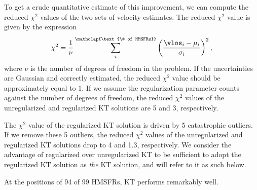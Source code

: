 To get a crude quantitative estimate of this improvement, we can compute the reduced $\chi^2$ values of the two sets of velocity estimates. 
The reduced $\chi^2$ value is given by the expression
\begin{equation}
\chi^2 = \frac{1}{\nu} \sum_i^{\mathclap{\text{\# of HMSFRs}}} \left(\frac{\vlos_i - \mu_i}{\sigma_i} \right)^2, 
\end{equation}
where $\nu$ is the number of degrees of freedom in the problem.
If the uncertainties are Gaussian and correctly estimated, the reduced $\chi^2$ value should be approximately equal to 1.
If we assume the regularization parameter counts against the number of degrees of freedom, the reduced $\chi^2$ values of the unregularized and regularized KT solutions are 5 and 3, respectively.

The $\chi^2$ value of the regularized KT solution is driven by 5 catastrophic outliers. 
If we remove these 5 outliers, the reduced $\chi^2$ values of the unregularized and regularized KT solutions drop to 4 and 1.3, respectively. 
We consider the advantage of regularized over unregularized KT to be sufficient to adopt the regularized KT solution as \emph{the} KT solution, and will refer to it as such below.

At the positions of 94 of 99 HMSFRs, KT performs remarkably well. 
